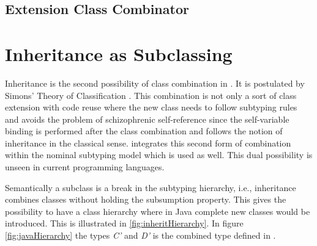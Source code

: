 
\subsection{Extension Class Combinator}



%
%
%
%

\section{Inheritance as Subclassing}
Inheritance is the second possibility of class combination in \ooplss. It
is postulated by Simons' Theory of Classification \cite{simons_theory_2004-2}.
This combination is not only a sort of class extension with code reuse where
the new class needs to follow subtyping rules and avoids the problem of
schizophrenic self-reference since the self-variable binding is performed after
the class combination and follows the notion of inheritance in the
classical sense. \ooplss integrates this second form of combination within
the nominal subtyping model which is used as well. This dual possibility is
unseen in current programming languages.

Semantically a subclass is a break in the subtyping hierarchy, i.e., inheritance
combines classes without holding the subsumption property. This gives \ooplss
the possibility to have a class hierarchy where in Java complete new classes
would be introduced. This is illustrated in \cref{fig:inheritHierarchy}. In figure
\ref{fig:javaHierarchy} the types \emph{C'} and \emph{D'} is the combined type
defined in \ooplss.

